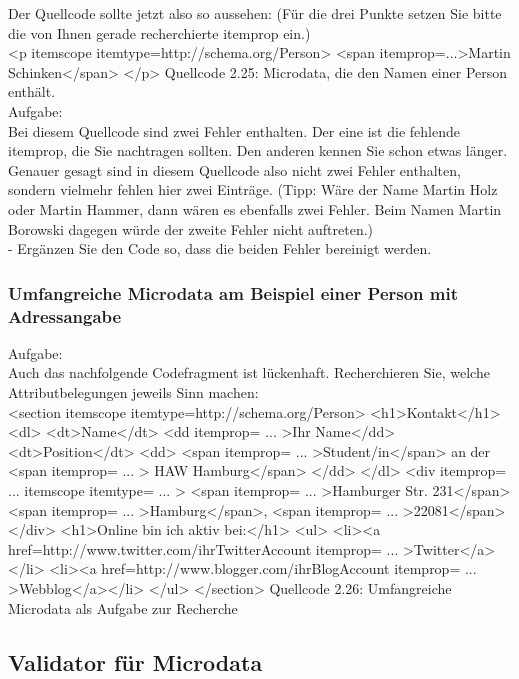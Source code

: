 Der Quellcode sollte jetzt also so aussehen: (Für die drei Punkte setzen Sie bitte die von Ihnen gerade recherchierte itemprop ein.)\\

<p itemscope itemtype=http://schema.org/Person>
<span itemprop=...>Martin Schinken</span>
</p>
Quellcode 2.25: Microdata, die den Namen einer Person enthält.\\

Aufgabe:\\

Bei diesem Quellcode sind zwei Fehler enthalten. Der eine ist die fehlende itemprop, die Sie nachtragen sollten. Den anderen kennen Sie schon etwas länger. Genauer gesagt sind in diesem Quellcode also nicht zwei Fehler enthalten, sondern vielmehr fehlen hier zwei Einträge. (Tipp: Wäre der Name Martin Holz oder Martin Hammer, dann wären es ebenfalls zwei Fehler. Beim Namen Martin Borowski dagegen würde der zweite Fehler nicht auftreten.)\\

-	Ergänzen Sie den Code so, dass die beiden Fehler bereinigt werden.

\subsubsection{Umfangreiche Microdata am Beispiel einer Person mit Adressangabe}

Aufgabe:\\

Auch das nachfolgende Codefragment ist lückenhaft. Recherchieren Sie, welche Attributbelegungen jeweils Sinn machen:\\

<section itemscope itemtype=http://schema.org/Person>
<h1>Kontakt</h1>
<dl>
<dt>Name</dt>
<dd itemprop= ... >Ihr Name</dd>
<dt>Position</dt>
<dd>
<span itemprop= ... >Student/in</span> an der
<span itemprop= ... > HAW Hamburg</span>
</dd>
</dl>
<div itemprop= ... itemscope itemtype= ... >
<span itemprop= ... >Hamburger Str. 231</span>
<span itemprop= ... >Hamburg</span>,
<span itemprop= ... >22081</span>
</div>
<h1>Online bin ich aktiv bei:</h1>
<ul>
<li><a href=http://www.twitter.com/ihrTwitterAccount itemprop= ... >Twitter</a></li>
<li><a href=http://www.blogger.com/ihrBlogAccount itemprop= ... >Webblog</a></li>
</ul>
</section>
Quellcode 2.26: Umfangreiche Microdata als Aufgabe zur Recherche

\subsection{Validator für Microdata}

